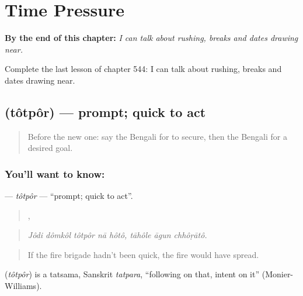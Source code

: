 
\chapter{Time Pressure}
\label{ch:bn-time-pressure}

\begin{chapteropening}
\textbf{By the end of this chapter:} \emph{I can talk about rushing, breaks and dates drawing near.}

Complete the last lesson of chapter 544: I can talk about rushing, breaks and dates drawing near.
\end{chapteropening}

\section[\texorpdfstring{\bn{তৎপর} (tôtpôr)}{তৎপর (tôtpôr)}]{ (tôtpôr) — prompt; quick to act}

\label{lesson:BN-C544-totpor}



\begin{quote}
Before the new one: say the Bengali for to secure, then the Bengali for a desired goal.
\end{quote}

\subsection*{You'll want to know: }
\textbf{} — \emph{tôtpôr} — \textquotedblleft{}prompt; quick to act\textquotedblright{}.

\begin{quote}
    ,   
\end{quote}

\begin{quote}
\emph{Jôdi dômkôl tôtpôr nā hôtô, tāhôle āgun chhôṛātô.}
\end{quote}

\begin{quote}
If the fire brigade hadn't been quick, the fire would have spread.
\end{quote}

\begin{cousinweb}
\textbf{} (\emph{tôtpôr}) is a tatsama, Sanskrit \emph{tatpara}, \textquotedblleft{}following on that, intent on it\textquotedblright{} (Monier-Williams).
\end{cousinweb}

